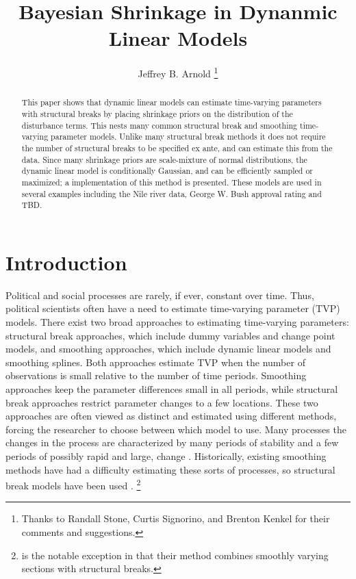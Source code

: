 \documentclass{article}
\author{Jeffrey B. Arnold%
\thanks{Thanks to Randall Stone, Curtis Signorino, and Brenton Kenkel for their comments and suggestions.}
}
\title{Bayesian Shrinkage in Dynanmic Linear Models}
\begin{document}
\maketitle{}

\begin{abstract}
  This paper shows that dynamic linear models can estimate time-varying parameters with structural breaks by placing shrinkage priors on the distribution of the disturbance terms. 
  This nests many common structural break and smoothing time-varying parameter models.
  Unlike many structural break methods it does not require the number of structural breaks to be specified ex ante, and can estimate this from the data.
  Since many shrinkage priors are scale-mixture of normal distributions, the dynamic linear model is conditionally Gaussian, and can be efficiently sampled or maximized; 
  a \Stan{} implementation of this method is presented.
  These models are used in several examples including the Nile river data, George W. Bush approval rating and TBD.
\end{abstract}

\section{Introduction}
\label{sec:introduction}

Political and social processes are rarely, if ever, constant over time.
Thus, political scientists often have a need to estimate time-varying parameter (TVP) models.
There exist two broad approaches to estimating time-varying parameters: structural break approaches, which include dummy variables and change point models, and smoothing approaches, which include dynamic linear models and smoothing splines.
Both approaches estimate TVP when the number of observations is small relative to the number of time periods. 
Smoothing approaches keep the parameter differences small in all periods, while structural break approaches restrict parameter changes to a few locations.
These two approaches are often viewed as distinct and estimated using different methods, forcing the researcher to choose between which model to use.
Many processes the changes in the process are characterized by many periods of stability and a few periods of possibly rapid and large, change \parencite{RatkovicEng2010}.
Historically, existing smoothing methods have had a difficulty estimating these sorts of processes, so structural break models have been used \parencites{CalderiaZorn1998}{Spirling2007a}{Spirling2007b}{Park2010}{Park2011}.%
\footnote{\textcite{RatkovicEng2010} is the notable exception in that their method combines smoothly varying sections with structural breaks.}
\end{document}
